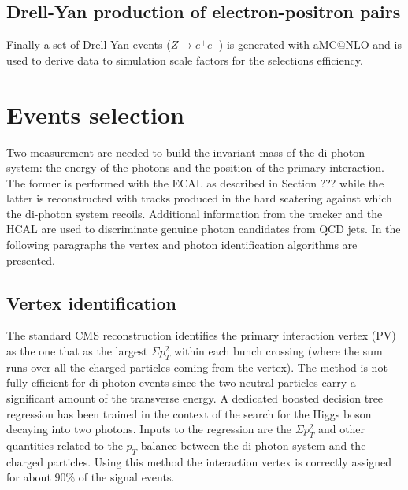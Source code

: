 \subsection{Drell-Yan production of electron-positron pairs}
Finally a set of Drell-Yan events ($Z \to e^{+}e^{-}$) is generated with aMC@NLO and is
used to derive data to simulation scale factors for the selections efficiency.

\section{Events selection}
Two measurement are needed to build the invariant mass of the di-photon system: the energy of the
photons and the position of the primary interaction. The former is performed with the ECAL as described in
Section ??? while the latter is reconstructed with tracks produced in the hard scatering against which
the di-photon system recoils. Additional information from the tracker and the HCAL are used to discriminate
genuine photon candidates from QCD jets.
In the following paragraphs the vertex and photon identification algorithms are presented.

\subsection{Vertex identification}
The standard CMS reconstruction identifies the primary interaction vertex (PV) as the one 
that as the largest $\Sigma p_T^2$ within each bunch crossing (where the sum runs over all the charged particles
coming from the vertex). The method is not fully efficient for di-photon events since the two neutral
particles carry a significant amount of the transverse energy.
A dedicated boosted decision tree regression has been trained in the context of the search for the
Higgs boson decaying into two photons. Inputs to the regression are the $\Sigma p_T^2$ and
other quantities related to the $p_T$ balance between the di-photon system and the charged particles.
Using this method the interaction vertex is correctly assigned for about $90\%$ of the signal events.

